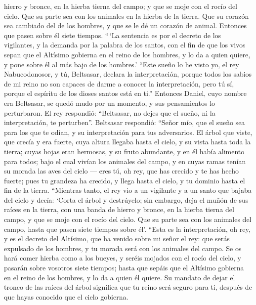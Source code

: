 hierro y bronce, en la hierba tierna del campo; y que se moje con el
rocío del cielo. Que su parte sea con los animales en la hierba de la
tierra.  Que su corazón sea cambiado del de los hombres,
y que se le dé un corazón de animal. Entonces que pasen sobre él siete
tiempos.  ``\,`La sentencia es por el decreto de los
vigilantes, y la demanda por la palabra de los santos, con el fin de que
los vivos sepan que el Altísimo gobierna en el reino de los hombres, y
lo da a quien quiere, y pone sobre él al más bajo de los hombres.'
 ``Este sueño lo he visto yo, el rey Nabucodonosor, y tú,
Beltsasar, declara la interpretación, porque todos los sabios de mi
reino no son capaces de darme a conocer la interpretación, pero tú sí,
porque el espíritu de los dioses santos está en ti.'' 
Entonces Daniel, cuyo nombre era Beltsasar, se quedó mudo por un
momento, y sus pensamientos lo perturbaron. El rey respondió:
``Beltsasar, no dejes que el sueño, ni la interpretación, te
perturben''. Beltsasar respondió: ``Señor mío, que el sueño sea para los
que te odian, y su interpretación para tus adversarios. 
El árbol que viste, que crecía y era fuerte, cuya altura llegaba hasta
el cielo, y su vista hasta toda la tierra;  cuyas hojas
eran hermosas, y su fruto abundante, y en él había alimento para todos;
bajo el cual vivían los animales del campo, y en cuyas ramas tenían su
morada las aves del cielo ---  eres tú, oh rey, que has
crecido y te has hecho fuerte; pues tu grandeza ha crecido, y llega
hasta el cielo, y tu dominio hasta el fin de la tierra. 
``Mientras tanto, el rey vio a un vigilante y a un santo que bajaba del
cielo y decía: `Corta el árbol y destrúyelo; sin embargo, deja el muñón
de sus raíces en la tierra, con una banda de hierro y bronce, en la
hierba tierna del campo, y que se moje con el rocío del cielo. Que su
parte sea con los animales del campo, hasta que pasen siete tiempos
sobre él'.  ``Esta es la interpretación, oh rey, y es el
decreto del Altísimo, que ha venido sobre mi señor el rey:
 que serás expulsado de los hombres, y tu morada será con
los animales del campo. Se os hará comer hierba como a los bueyes, y
seréis mojados con el rocío del cielo, y pasarán sobre vosotros siete
tiempos; hasta que sepáis que el Altísimo gobierna en el reino de los
hombres, y lo da a quien él quiere.  Su mandato de dejar
el tronco de las raíces del árbol significa que tu reino será seguro
para ti, después de que hayas conocido que el cielo gobierna.
